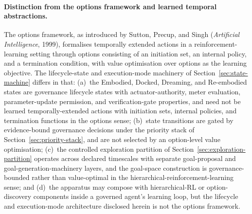 \documentclass[a4paper,12pt]{article}
\begin{document}
\paragraph{Distinction from the options framework and learned
temporal abstractions.}
The options framework, as introduced by Sutton, Precup, and
Singh (\emph{Artificial Intelligence}, 1999), formalises
temporally extended actions in a reinforcement-learning setting
through options consisting of an initiation set, an internal
policy, and a termination condition, with value optimisation
over options as the learning objective. The lifecycle-state and
execution-mode machinery of Section~\ref{sec:state-machine}
differs in that: (a)~the Embodied, Docked, Dreaming, and
Re-embodied states are governance lifecycle states with
actuator-authority, meter evaluation, parameter-update
permission, and verification-gate properties, and need not be
learned temporally-extended actions with initiation sets,
internal policies, and termination functions in the options
sense; (b)~state transitions are gated by evidence-bound
governance decisions under the priority stack of
Section~\ref{sec:priority-stack}, and are not selected by an
option-level value optimisation; (c)~the controlled exploration
partition of Section~\ref{sec:exploration-partition} operates
across declared timescales with separate goal-proposal and
goal-generation-machinery layers, and the goal-space
construction is governance-bounded rather than value-optimal in
the hierarchical-reinforcement-learning sense; and (d)~the
apparatus may compose with hierarchical-RL or option-discovery
components inside a governed agent's learning loop, but the
lifecycle and execution-mode architecture disclosed herein is
not the options framework.
\end{document}
